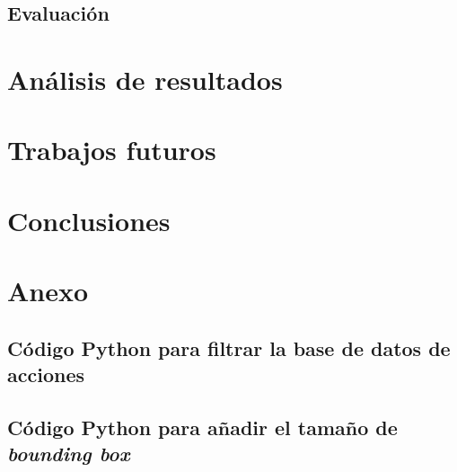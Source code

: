 \documentclass[12pt]{report} %
\begin{document}
    \section{Evaluación}

    \chapter{Análisis de resultados}
    \label{chap:resultados}

    \chapter{Trabajos futuros}
    \label{chap:future}

    \chapter{Conclusiones}
    \label{chap:conclusion}



    \clearpage

    \label{chap:bibliography}
    \printbibliography


    \chapter*{Anexo}
    \label{anexo}

    \section*{Código Python para filtrar la base de datos de acciones}
    \label{filtrado_script}
    

    \section*{Código Python para añadir el tamaño de \textit{bounding box}}
    \label{mod_ball}
    
\end{document}

